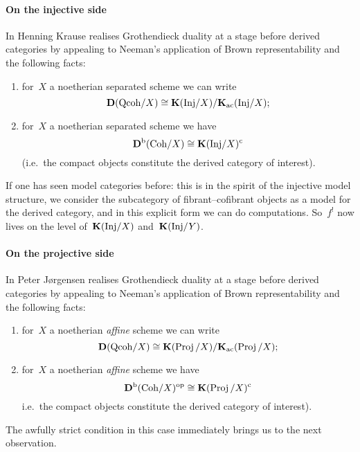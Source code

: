 \paragraph{On the injective side}
In \cite[\S 6]{krause-stable-derived-category} Henning Krause realises Grothendieck duality at a stage before derived categories by appealing to Neeman's application of Brown representability and the following facts:
\begin{enumerate}
  \item for~$X$ a noetherian separated scheme we can write
    \begin{equation}
      \mathbf{D}(\mathrm{Qcoh}/X)\cong\mathbf{K}(\mathrm{Inj}/X)/\mathbf{K}_{\mathrm{ac}}(\mathrm{Inj}/X);
    \end{equation}
  \item for~$X$ a noetherian separated scheme we have
    \begin{equation}
      \mathbf{D}^{\mathrm{b}}(\mathrm{Coh}/X)\cong\mathbf{K}(\mathrm{Inj}/X)^{\mathrm{c}}
    \end{equation}
    (i.e.\ the compact objects constitute the derived category of interest).
\end{enumerate}
If one has seen model categories before: this is in the spirit of the injective model structure, we consider the subcategory of fibrant--cofibrant objects as a model for the derived category, and in this explicit form we can do computations. So~$f^!$ now lives on the level of~$\mathbf{K}(\mathrm{Inj}/X)$ and~$\mathbf{K}(\mathrm{Inj}/Y)$.

\paragraph{On the projective side}
In \cite{jorgensen-homotopy-category-projectives} Peter J\o rgensen realises Grothendieck duality at a stage before derived categories by appealing to Neeman's application of Brown representability and the following facts:
\begin{enumerate}
  \item for~$X$ a noetherian \emph{affine} scheme we can write
    \begin{equation}
      \mathbf{D}(\mathrm{Qcoh}/X)\cong\mathbf{K}(\operatorname{Proj}/X)/\mathbf{K}_{\mathrm{ac}}(\operatorname{Proj}/X);
    \end{equation}
  \item for~$X$ a noetherian \emph{affine} scheme we have
    \begin{equation}
      \mathbf{D}^{\mathrm{b}}(\mathrm{Coh}/X)^{\mathrm{op}}\cong\mathbf{K}(\operatorname{Proj}/X)^{\mathrm{c}}
    \end{equation}
    i.e.\ the compact objects constitute the derived category of interest).
\end{enumerate}
The awfully strict condition in this case immediately brings us to the next observation.

